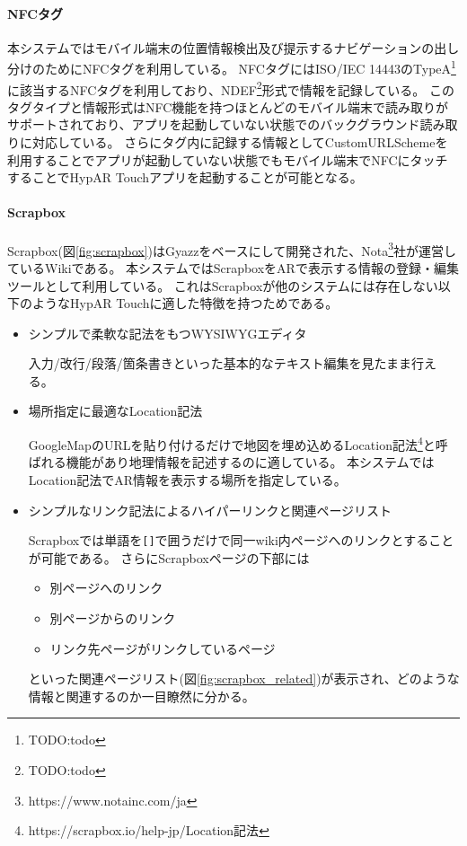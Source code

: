 \paragraph*{NFCタグ}
本システムではモバイル端末の位置情報検出及び提示するナビゲーションの出し分けのためにNFCタグを利用している。
NFCタグにはISO/IEC 14443のTypeA\footnote{\textsf{TODO:todo}}に該当するNFCタグを利用しており、NDEF\footnote{\textsf{TODO:todo}}形式で情報を記録している。
このタグタイプと情報形式はNFC機能を持つほとんどのモバイル端末で読み取りがサポートされており、アプリを起動していない状態でのバックグラウンド読み取りに対応している。
さらにタグ内に記録する情報としてCustomURLSchemeを利用することでアプリが起動していない状態でもモバイル端末でNFCにタッチすることでHypAR Touchアプリを起動することが可能となる。

\paragraph*{Scrapbox}
Scrapbox(図\ref{fig:scrapbox})はGyazz\cite{Gyazz}をベースにして開発された、Nota\footnote{\textsf{https://www.notainc.com/ja}}社が運営しているWikiである。
本システムではScrapboxをARで表示する情報の登録・編集ツールとして利用している。
これはScrapboxが他のシステムには存在しない以下のようなHypAR Touchに適した特徴を持つためである。
\begin{itemize}
  \item シンプルで柔軟な記法をもつWYSIWYGエディタ
  
  入力/改行/段落/箇条書きといった基本的なテキスト編集を見たまま行える。
  
  \item 場所指定に最適なLocation記法
  
  GoogleMapのURLを貼り付けるだけで地図を埋め込めるLocation記法\footnote{\textsf{https://scrapbox.io/help-jp/Location記法}}と呼ばれる機能があり地理情報を記述するのに適している。
  本システムではLocation記法でAR情報を表示する場所を指定している。

  \item シンプルなリンク記法によるハイパーリンクと関連ページリスト
  
  Scrapboxでは単語を\texttt{[]}で囲うだけで同一wiki内ページへのリンクとすることが可能である。
  さらにScrapboxページの下部には
  \begin{itemize}
      \item 別ページへのリンク
      \item 別ページからのリンク
      \item リンク先ページがリンクしているページ
  \end{itemize}
  といった関連ページリスト(図\ref{fig:scrapbox_related})が表示され、どのような情報と関連するのか一目瞭然に分かる。

\end{itemize}

